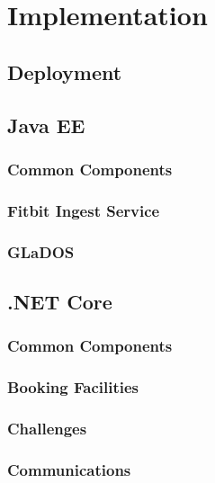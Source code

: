 \chapter{Implementation}

\section{Deployment}

\section{Java EE}
    \subsection{Common Components}
    	

    \subsection{Fitbit Ingest Service}
        

    \subsection{GLaDOS}
    	

\section{.NET Core}
    \subsection{Common Components}
    	
    \subsection{Booking Facilities}
    	
    \subsection{Challenges}
    	
    \subsection{Communications}
    	
